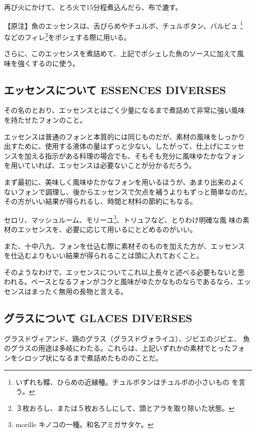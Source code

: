 \documentclass[twoside,12Q,b5paper,tombo]{escoffierltjsbook}
\newenvironment{recette}{\begin{multicols}{2}}{\end{multicols}}
\begin{document}
\begin{recette}
再び火にかけて、とろ火で15分程煮込んだら、布で漉す。

【原注】魚のエッセンスは、舌びらめやチュルボ、チュルボタン、バルビュ
\footnote{いずれも鰈、ひらめの近縁種。チュルボタンはチュルボの小さいもの
  を言う。} などのフィレ\footnote{３枚おろし、または５枚おろしにして、頭とアラを取り除いた状態。}をポシェする際に用いる。

さらに、このエッセンスを煮詰めて、上記でポシェした魚のソースに加えて風
味を強くするのに使う。

\subsection{エッセンスについて ESSENCES
DIVERSES}\label{ux30a8ux30c3ux30bbux30f3ux30b9ux306bux3064ux3044ux3066-essences-diverses}

その名のとおり、エッセンスとはごく少量になるまで煮詰めて非常に強い風味
を持たせたフォンのこと。

エッセンスは普通のフォンと本質的には同じものだが、素材の風味をしっかり
出すために、使用する液体の量はずっと少ない。したがって、仕上げにエッセ
ンスを加える指示がある料理の場合でも、そもそも充分に風味ゆたかなフォン
を用いていれば、エッセンスは必要ないことが分かるだろう。

まず最初に、美味しく風味ゆたかなフォンを用いるほうが、あまり出来のよく
ないフォンで調理し、後からエッセンスで欠点を補うよりもずっと簡単なのだ。
その方がいい結果が得られるし、時間と材料の節約にもなる。

セロリ、マッシュルーム、モリーユ\footnote{morille
  キノコの一種。和名アミガサタケ。}、トリュフなど、とりわけ明確な風
味の素材のエッセンスを、必要に応じて用いるにとどめるのがいい。

また、十中八九、フォンを仕込む際に素材そのものを加えた方が、エッセンス
を仕込むよりもいい結果が得られることは頭に入れておくこと。

そのようなわけで、エッセンスについてこれ以上長々と述べる必要もないと思
われる。ベースとなるフォンがコクと風味がゆたかなものならであるなら、エッ
センスはまったく無用の長物と言える。

\subsection{グラスについて GLACES
DIVERSES}\label{ux30b0ux30e9ux30b9ux306bux3064ux3044ux3066-glaces-diverses}

グラスドヴィアンド、鶏のグラス（グラスドヴォライユ）、ジビエのジビエ、
魚のグラスの用途は多岐にわたる。これらは、上記いずれかの素材でとったフォ
ンをシロップ状になるまで煮詰めたもののことだ。


\end{recette}
\end{document}
